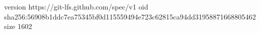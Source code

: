 version https://git-lfs.github.com/spec/v1
oid sha256:56908b1ddc7ea75345bf0d115559494e723c62815ca94dd31958871668805462
size 1602
